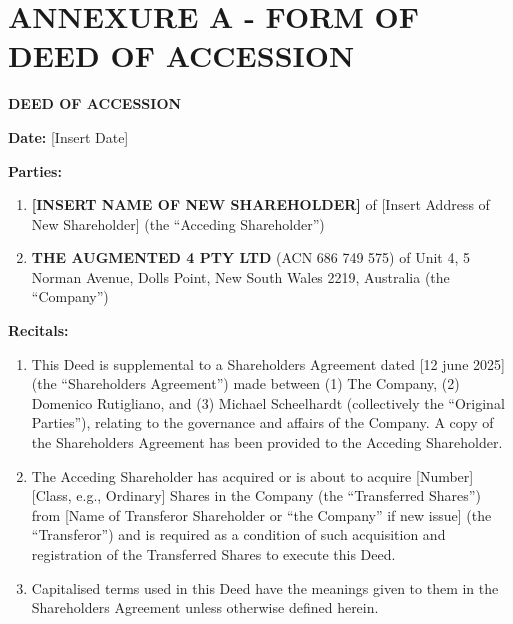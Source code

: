 \section*{ANNEXURE A - FORM OF DEED OF ACCESSION}

\textbf{DEED OF ACCESSION}

\textbf{Date:} [Insert Date]

\textbf{Parties:}
\begin{enumerate}
    \item \textbf{[INSERT NAME OF NEW SHAREHOLDER]} of [Insert Address of New Shareholder] (the ``Acceding Shareholder'')
    \item \textbf{THE AUGMENTED 4 PTY LTD} (ACN 686 749 575) of Unit 4, 5 Norman Avenue, Dolls Point, New South Wales 2219, Australia (the ``Company'')
\end{enumerate}

\textbf{Recitals:}
\begin{enumerate}[label=\Alph*.]
    \item This Deed is supplemental to a Shareholders Agreement dated [12 june 2025] (the ``Shareholders Agreement'') made between (1) The Company, (2) Domenico Rutigliano, and (3) Michael Scheelhardt (collectively the ``Original Parties''), relating to the governance and affairs of the Company. A copy of the Shareholders Agreement has been provided to the Acceding Shareholder.
    \item The Acceding Shareholder has acquired or is about to acquire [Number] [Class, e.g., Ordinary] Shares in the Company (the ``Transferred Shares'') from [Name of Transferor Shareholder or ``the Company'' if new issue] (the ``Transferor'') and is required as a condition of such acquisition and registration of the Transferred Shares to execute this Deed.
    \item Capitalised terms used in this Deed have the meanings given to them in the Shareholders Agreement unless otherwise defined herein.
\end{enumerate}

